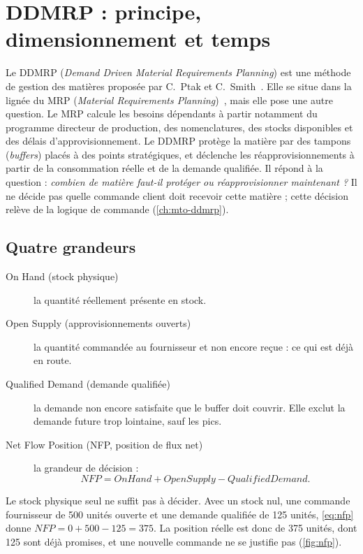 \chapter{DDMRP : principe, dimensionnement et temps}\label{ch:ddmrp}

Le DDMRP (\textit{Demand Driven Material Requirements Planning}) est une méthode de gestion
des matières proposée par C.~Ptak et C.~Smith~\cite{ptak}. Elle se situe dans la lignée du MRP
(\textit{Material Requirements Planning})~\cite{orlicky}, mais elle pose une autre question.
Le MRP calcule les besoins dépendants à partir notamment du programme directeur de production, des
nomenclatures, des stocks disponibles et des délais d'approvisionnement. Le DDMRP
protège la matière par des tampons (\textit{buffers}) placés à des points stratégiques, et
déclenche les réapprovisionnements à partir de la consommation réelle et de la demande
qualifiée. Il répond à la question : \emph{combien de matière faut-il protéger ou
réapprovisionner maintenant ?} Il ne décide pas quelle commande client doit recevoir cette
matière ; cette décision relève de la logique de commande (\cref{ch:mto-ddmrp}).

\section{Quatre grandeurs}

\begin{description}
  \item[On Hand (stock physique)] la quantité réellement présente en stock.
  \item[Open Supply (approvisionnements ouverts)] la quantité commandée au fournisseur et non
    encore reçue : ce qui est déjà en route.
  \item[Qualified Demand (demande qualifiée)] la demande non encore satisfaite que le buffer
    doit couvrir. Elle exclut la demande future trop lointaine, sauf les pics.
  \item[Net Flow Position (NFP, position de flux net)] la grandeur de décision :
    \begin{equation}\label{eq:nfp}
      NFP = OnHand + OpenSupply - QualifiedDemand.
    \end{equation}
\end{description}

Le stock physique seul ne suffit pas à décider. Avec un stock nul, une commande fournisseur
de 500 unités ouverte et une demande qualifiée de 125 unités, \cref{eq:nfp} donne
$NFP = 0 + 500 - 125 = 375$. La position réelle est donc de 375 unités, dont 125 sont déjà
promises, et une nouvelle commande ne se justifie pas (\cref{fig:nfp}).


